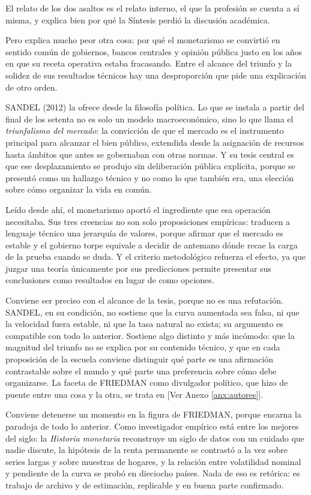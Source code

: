 \documentclass[10pt,a4paper]{article}
\newcommand{\authorfont}[1]{{\fontfamily{EBGaramond-TLF}\selectfont #1}}
\begin{document}
El relato de los dos asaltos es el relato interno, el que la profesión se cuenta a sí misma, y explica bien por qué la Síntesis perdió la discusión académica. 

Pero explica mucho peor otra cosa: por qué el monetarismo se convirtió en sentido común de gobiernos, bancos centrales y opinión pública justo en los años en que su receta operativa estaba fracasando. Entre el alcance del triunfo y la solidez de sus resultados técnicos hay una desproporción que pide una explicación de otro orden.

SANDEL (2012) la ofrece desde la filosofía política. Lo que se instala a partir del final de los setenta no es solo un modelo macroeconómico, sino lo que llama el \textit{triunfalismo del mercado}: la convicción de que el mercado es el instrumento principal para alcanzar el bien público, extendida desde la asignación de recursos hasta ámbitos que antes se gobernaban con otras normas. Y su tesis central es que ese desplazamiento se produjo sin deliberación pública explícita, porque se presentó como un hallazgo técnico y no como lo que también era, una elección sobre cómo organizar la vida en común.

Leído desde ahí, el monetarismo aportó el ingrediente que esa operación necesitaba. Sus tres creencias no son solo proposiciones empíricas: traducen a lenguaje técnico una jerarquía de valores, porque afirmar que el mercado es estable y el gobierno torpe equivale a decidir de antemano dónde recae la carga de la prueba cuando se duda. Y el criterio metodológico refuerza el efecto, ya que juzgar una teoría únicamente por sus predicciones permite presentar sus conclusiones como resultados en lugar de como opciones.

Conviene ser preciso con el alcance de la tesis, porque no es una refutación. SANDEL, en su condición, no sostiene que la curva aumentada sea falsa, ni que la velocidad fuera estable, ni que la tasa natural no exista; su argumento es compatible con todo lo anterior. Sostiene algo distinto y más incómodo: que la magnitud del triunfo no se explica por su contenido técnico, y que en cada proposición de la escuela conviene distinguir qué parte es una afirmación contrastable sobre el mundo y qué parte una preferencia sobre cómo debe organizarse. La faceta de FRIEDMAN como divulgador político, que hizo de puente entre una cosa y la otra, se trata en [\authorfont{Ver Anexo \ref{anx:autores}}].

Conviene detenerse un momento en la figura de FRIEDMAN, porque encarna la paradoja de todo lo anterior. Como investigador empírico está entre los mejores del siglo: la \textit{Historia monetaria} reconstruye un siglo de datos con un cuidado que nadie discute, la hipótesis de la renta permanente se contrastó a la vez sobre series largas y sobre muestras de hogares, y la relación entre volatilidad nominal y pendiente de la curva se probó en dieciocho países. Nada de eso es retórica: es trabajo de archivo y de estimación, replicable y en buena parte confirmado.
\end{document}
